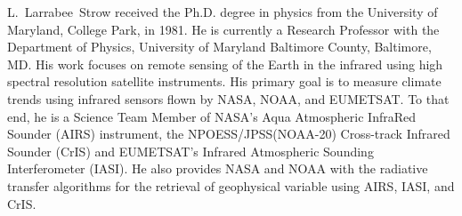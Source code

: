 \documentclass[journal]{IEEEtran}
\begin{document}

\begin{IEEEbiography}{L.~Larrabee~Strow}
  received the Ph.D. degree in physics from the University of
  Maryland, College Park, in 1981. He is currently a Research
  Professor with the Department of Physics, University of Maryland
  Baltimore County, Baltimore, MD. His work focuses on remote
  sensing of the Earth in the infrared using high spectral
  resolution satellite instruments. His primary goal is to measure
  climate trends using infrared sensors flown by NASA, NOAA, and
  EUMETSAT. To that end, he is a Science Team Member of NASA’s Aqua
  Atmospheric InfraRed Sounder (AIRS) instrument, the
  NPOESS/JPSS(NOAA-20) Cross-track Infrared Sounder (CrIS) and
  EUMETSAT's Infrared Atmospheric Sounding Interferometer (IASI).
  He also provides NASA and NOAA with the radiative transfer
  algorithms for the retrieval of geophysical variable using AIRS,
  IASI, and CrIS.
\end{IEEEbiography}
\end{document}
